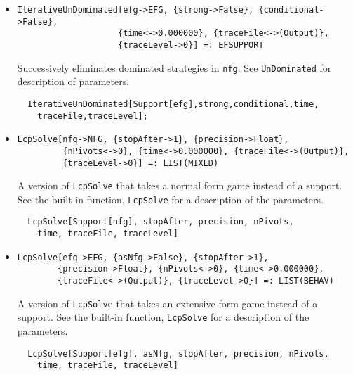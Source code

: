\begin{itemize}
\item{}
\protect \large \begin{verbatim}
IterativeUnDominated[efg->EFG, {strong->False}, {conditional->False}, 
                    {time<->0.000000}, {traceFile<->(Output)}, 
                    {traceLevel->0}] =: EFSUPPORT 
\end{verbatim}\normalsize

\bd 
Successively eliminates dominated strategies in \verb+nfg+. See
\verb+UnDominated+ for description of parameters.  
\begin{verbatim}
  IterativeUnDominated[Support[efg],strong,conditional,time,
    traceFile,traceLevel];
\end{verbatim} 
\ed




\item{}
\protect \large \begin{verbatim}
LcpSolve[nfg->NFG, {stopAfter->1}, {precision->Float}, 
         {nPivots<->0}, {time<->0.000000}, {traceFile<->(Output)}, 
         {traceLevel->0}] =: LIST(MIXED) 
\end{verbatim}\normalsize

\bd 
A version of \verb+LcpSolve+ that takes a normal form
game instead of a support.  See the built-in function,
\verb+LcpSolve+ for a description of the parameters.
\begin{verbatim}
  LcpSolve[Support[nfg], stopAfter, precision, nPivots,
    time, traceFile, traceLevel]
\end{verbatim} 
\ed

\item{}
\protect \large \begin{verbatim}
LcpSolve[efg->EFG, {asNfg->False}, {stopAfter->1}, 
        {precision->Float}, {nPivots<->0}, {time<->0.000000}, 
        {traceFile<->(Output)}, {traceLevel->0}] =: LIST(BEHAV) 
\end{verbatim}\normalsize

\bd 
A version of \verb+LcpSolve+ that takes an extensive form
game instead of a support.  See the built-in function,
\verb+LcpSolve+ for a description of the parameters.
\begin{verbatim}
  LcpSolve[Support[efg], asNfg, stopAfter, precision, nPivots,
    time, traceFile, traceLevel]
\end{verbatim} 
\ed


\end{itemize}
